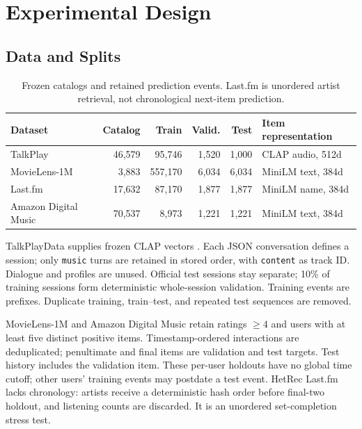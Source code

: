 \documentclass[runningheads]{llncs}
\begin{document}
\section{Experimental Design}
\label{sec:experiments}

\subsection{Data and Splits}

\begin{table}[t]
\centering\scriptsize
\setlength{\tabcolsep}{3pt}
\caption{Frozen catalogs and retained prediction events. Last.fm is unordered
artist retrieval, not chronological next-item prediction.}
\label{tab:datasets}
\begin{tabular}{lrrrrl}
\toprule
Dataset & Catalog & Train & Valid. & Test & Item representation\\
\midrule
TalkPlay & 46,579 & 95,746 & 1,520 & 1,000 & CLAP audio, 512d\\
MovieLens-1M & 3,883 & 557,170 & 6,034 & 6,034 & MiniLM text, 384d\\
Last.fm & 17,632 & 87,170 & 1,877 & 1,877 & MiniLM name, 384d\\
Amazon Digital Music & 70,537 & 8,973 & 1,221 & 1,221 & MiniLM text, 384d\\
\bottomrule
\end{tabular}
\end{table}

TalkPlayData \cite{musiccrs2026} supplies frozen CLAP vectors
\cite{elizalde2023clap}. Each JSON conversation defines a session; only
\texttt{music} turns are retained in stored order, with \texttt{content} as
track ID. Dialogue and profiles are unused. Official test sessions stay
separate; 10\% of training sessions form deterministic whole-session
validation. Training events are prefixes. Duplicate training, train--test,
and repeated test sequences are removed.

MovieLens-1M \cite{harper2015movielens} and Amazon Digital Music
\cite{hou2026blair} retain ratings $\geq4$ and users with at least five distinct
positive items. Timestamp-ordered interactions are deduplicated; penultimate
and final items are validation and test targets. Test history includes the
validation item. These per-user holdouts have no global time cutoff; other
users' training events may postdate a test event. HetRec Last.fm
\cite{cantador2011hetrec} lacks chronology: artists receive a deterministic
hash order before final-two holdout, and listening counts are discarded.
It is an unordered set-completion stress test.
\end{document}
